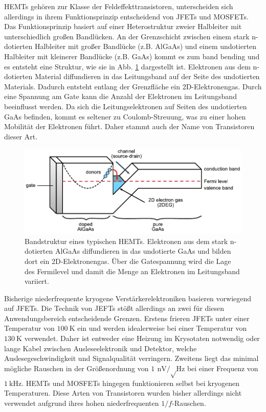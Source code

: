 \acp{HEMT} gehören zur Klasse der Feldeffekttransistoren, unterscheiden sich allerdings in ihrem Funktionsprinzip entscheidend von \acsp{JFET} und \acsp{MOSFET}.
Das Funktionsprinzip basiert auf einer Heterostruktur zweier Halbleiter mit unterschiedlich großen Bandlücken.
An der Grenzschicht zwischen einem stark n-dotierten Halbleiter mit großer Bandlücke (z.B. AlGaAs) und einem undotierten Halbleiter mit kleinerer Bandlücke (z.B. GaAs) kommt es zum band bending und es entsteht eine Struktur, wie sie in Abb. \ref{fig:HEMTBand} dargestellt ist.
Elektronen aus dem n-dotierten Material diffundieren in das Leitungsband auf der Seite des undotierten Materials.
Dadurch entsteht entlang der Grenzfläche ein 2D-Elektronengas.
Durch eine Spannung am Gate kann die Anzahl der Elektronen im Leitungsband beeinflusst werden.
Da sich die Leitungselektronen auf Seiten des undotierten GaAs befinden, kommt es seltener zu Coulomb-Streuung, was zu einer hohen Mobilität der Elektronen führt.
Daher stammt auch der Name von Transistoren dieser Art.\cite{HEMTFundamental, Mimura2002}

\begin{figure}[!b]
\begin{center}
\includegraphics[scale=1]{./fig/HEMTBand.pdf}
\vspace{-0.5cm}
\caption{Bandstruktur eines typischen HEMTs.
Elektronen aus dem stark n-dotierten AlGaAs diffundieren in das undotierte GaAs und bilden dort ein 2D-Elektronengas.
Über die Gatespannung wird die Lage des Fermilevel und damit die Menge an Elektronen im Leitungsband variiert.\cite{Thomas2016}}
\label{fig:HEMTBand}
\end{center}
\end{figure}

Bisherige niederfrequente kryogene Verstärkerelektroniken basieren vorwiegend auf JFETs.
Die Technik von JEFTs stößt allerdings an zwei für diesen Anwendungsbereich entscheidende Grenzen.
Erstens frieren JFETs unter einer Temperatur von $\SI{100}{\kelvin}$ ein und werden idealerweise bei einer Temperatur von $\SI{130}{\kelvin}$ verwendet.
Daher ist entweder eine Heizung im Krysotaten notwendig oder lange Kabel zwischen Ausleseelektronik und Detektor, welche Auslesegeschwindigkeit und Signalqualität verringern.
Zweitens liegt das minimal mögliche Rauschen in der Größenordnung von $\SI{1}{\nano\volt\per\sqrt\hertz}$ bei einer Frequenz von $\SI{1}{\kilo\hertz}$\cite{HEMTYang2011}.
HEMTs und MOSFETs hingegen funktionieren selbst bei kryogenen Temperaturen.
Diese Arten von Transistoren wurden bisher allerdings nicht verwendet aufgrund ihres hohen niederfrequenten $1/f$-Rauschen.

